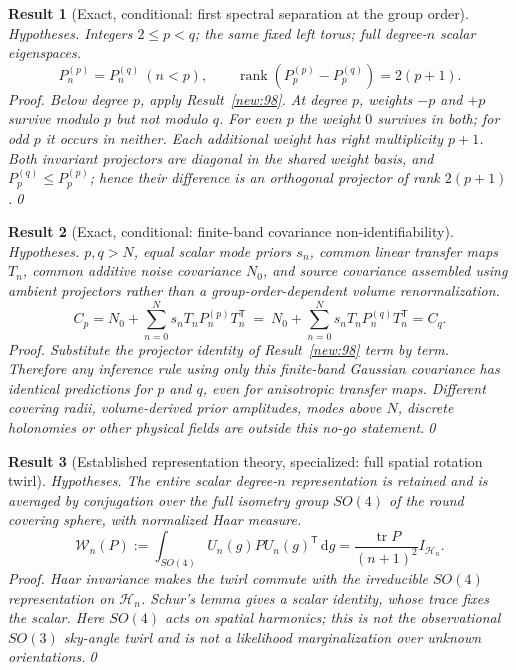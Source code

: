 \documentclass[aps,prd,onecolumn,notitlepage,groupedaddress,11pt]{revtex4-2}
\newtheorem{result}{Result}
\begin{document}
\begin{result}[\textsf{Exact, conditional}: first spectral separation at the group order]\label{new:100}
\textit{Hypotheses.} Integers $2\le p<q$; the same fixed left torus; full degree-$n$ scalar eigenspaces.
\begin{equation}\label{new:eq100}
P_n^{(p)}=P_n^{(q)}\ (n<p),\qquad
\operatorname{rank}(P_p^{(p)}-P_p^{(q)})=2(p+1).
\end{equation}
\textit{Proof.} Below degree $p$, apply Result~\ref{new:98}. At degree $p$, weights $-p$ and $+p$ survive modulo $p$ but not modulo $q$. For even $p$ the weight $0$ survives in both; for odd $p$ it occurs in neither. Each additional weight has right multiplicity $p+1$. Both invariant projectors are diagonal in the shared weight basis, and $P_p^{(q)}\le P_p^{(p)}$; hence their difference is an orthogonal projector of rank $2(p+1)$.\qed
\end{result}

\begin{result}[\textsf{Exact, conditional}: finite-band covariance non-identifiability]\label{new:101}
\textit{Hypotheses.} $p,q>N$, equal scalar mode priors $s_n$, common linear transfer maps $T_n$, common additive noise covariance $N_0$, and source covariance assembled using ambient projectors rather than a group-order-dependent volume renormalization.
\begin{equation}\label{new:eq101}
C_p=N_0+\sum_{n=0}^{N}s_nT_nP_n^{(p)}T_n^{\mathsf T}
\ =\ N_0+\sum_{n=0}^{N}s_nT_nP_n^{(q)}T_n^{\mathsf T}=C_q.
\end{equation}
\textit{Proof.} Substitute the projector identity of Result~\ref{new:98} term by term. Therefore any inference rule using \emph{only this finite-band Gaussian covariance} has identical predictions for $p$ and $q$, even for anisotropic transfer maps. Different covering radii, volume-derived prior amplitudes, modes above $N$, discrete holonomies or other physical fields are outside this no-go statement.\qed
\end{result}

\begin{result}[\textsf{Established representation theory, specialized}: full spatial rotation twirl]\label{new:102}
\textit{Hypotheses.} The entire scalar degree-$n$ representation is retained and is averaged by conjugation over the full isometry group $SO(4)$ of the round covering sphere, with normalized Haar measure.
\begin{equation}\label{new:eq102}
\mathcal W_n(P):=\int_{SO(4)}U_n(g)PU_n(g)^{\mathsf T}\,\mathrm dg
=\frac{\operatorname{tr}P}{(n+1)^2}I_{\mathcal H_n}.
\end{equation}
\textit{Proof.} Haar invariance makes the twirl commute with the irreducible $SO(4)$ representation on $\mathcal H_n$. Schur's lemma gives a scalar identity, whose trace fixes the scalar. Here $SO(4)$ acts on \emph{spatial harmonics}; this is not the observational $SO(3)$ sky-angle twirl and is not a likelihood marginalization over unknown orientations.\qed
\end{result}
\end{document}
